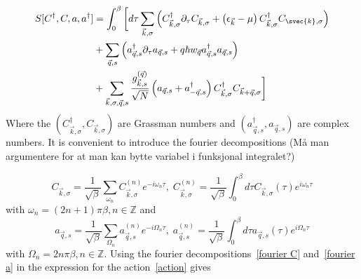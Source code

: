 \documentclass{article}
\begin{document}
\begin{align}
    S[C^{\dagger},C,a,a^{\dagger}] &= \int_0^{\beta}\bigg[d\tau \sum_{\vec{k},\sigma}\left( C_{\vec{k},\sigma}^{\dagger} \partial_{\tau} C_{\vec{k},\sigma} + \left(\epsilon_{\vec{k}} - \mu\right) C_{\vec{k},\sigma}^{\dagger} C_{\svec{k},\sigma}\right) \nonumber\\ 
                                  &+ \sum_{\vec{q},s}\left( a_{\vec{q},s}^{\dagger} \partial_{\tau} a_{\vec{q},s} +q \hbar w_{\vec{q}} a_{\vec{q},s}^{\dagger}a_{\vec{q},s}\right) \label{action} \\
                                  &+ \sum_{\vec{k},\sigma,\vec{q},s} \frac{g_{\vec{k},s}^{(\vec{q})}}{\sqrt{N}} \left(a_{\vec{q},s} + a_{-\vec{q}, s}^{\dagger}\right) C_{\vec{k},\sigma}^{\dagger} C_{\vec{k} + \vec{q},\sigma}\bigg]\nonumber
\end{align}
Where the $(C_{\vec{k},\sigma}^{\dagger}, C_{\vec{k},\sigma})$ are Grassman numbers and $(a_{\vec{q},s}^{\dagger},a_{\vec{q},s})$ are complex numbers. It is convenient to introduce the fourier decompositions (Må man argumentere for at man kan bytte variabel i funksjonal integralet?)

\begin{equation}
C_{\vec{k},\sigma} = \frac{1}{\sqrt{\beta}}\sum_{\omega_n} C^{(n)}_{\vec{k},\sigma} e^{-i \omega_n \tau},\; C^{(n)}_{\vec{k},\sigma} = \frac{1}{\sqrt{\beta}} \int_0^{\beta} d\tau C_{\vec{k},\sigma}(\tau) e^{i \omega_n \tau}
\label{fourier C}
\end{equation}
with $\omega_n = (2n + 1)\pi\beta, n \in  \mathbb{Z}$ and
\begin{equation}
a_{\vec{q},s} = \frac{1}{\sqrt{\beta}}\sum_{\Omega_n} a^{(n)}_{\vec{q},s} e^{-i \Omega_n \tau},\; a^{(n)}_{\vec{q},s} = \frac{1}{\sqrt{\beta}} \int_0^{\beta} d\tau a_{\vec{q},s}(\tau) e^{i \Omega_n \tau}
\label{fourier a}
\end{equation}
with  $\Omega_n = 2n\pi\beta, n \in  \mathbb{Z}$. Using the fourier decompositions~\cref{fourier C} and~\cref{fourier a} in the expression for the action~\cref{action} gives
\end{document}
